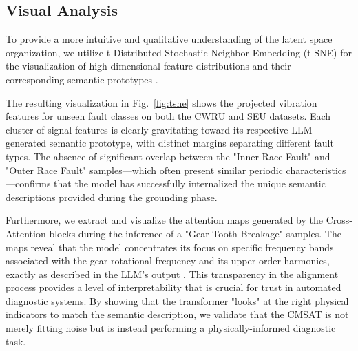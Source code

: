 \subsection{Visual Analysis}
To provide a more intuitive and qualitative understanding of the latent space organization, we utilize t-Distributed Stochastic Neighbor Embedding (t-SNE) for the visualization of high-dimensional feature distributions and their corresponding semantic prototypes \cite{key_visual_tsne}.

The resulting visualization in Fig.~\ref{fig:tsne} shows the projected vibration features for unseen fault classes on both the CWRU and SEU datasets. Each cluster of signal features is clearly gravitating toward its respective LLM-generated semantic prototype, with distinct margins separating different fault types. The absence of significant overlap between the "Inner Race Fault" and "Outer Race Fault" samples—which often present similar periodic characteristics—confirms that the model has successfully internalized the unique semantic descriptions provided during the grounding phase.

Furthermore, we extract and visualize the attention maps generated by the Cross-Attention blocks during the inference of a "Gear Tooth Breakage" samples. The maps reveal that the model concentrates its focus on specific frequency bands associated with the gear rotational frequency and its upper-order harmonics, exactly as described in the LLM's output \cite{key_attention_visualization}. This transparency in the alignment process provides a level of interpretability that is crucial for trust in automated diagnostic systems. By showing that the transformer "looks" at the right physical indicators to match the semantic description, we validate that the CMSAT is not merely fitting noise but is instead performing a physically-informed diagnostic task.
